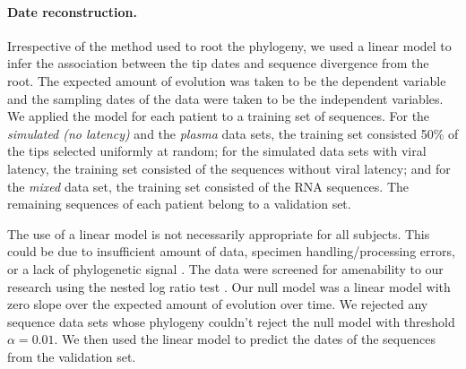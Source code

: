 \documentclass{bmcart}
\begin{document}
\paragraph * {Date reconstruction.} \label{subsec:daterecon}

Irrespective of the method used to root the phylogeny, we used a linear model to infer the association between the tip dates and sequence divergence from the root. 
The expected amount of evolution was taken to be the dependent variable and the sampling dates of the data were taken to be the independent variables.
We applied the model for each patient to a training set of sequences.
For the \emph{simulated (no latency)} and the \emph{plasma} data sets, the training set consisted 50\% of the tips selected uniformly at random; for the simulated data sets with viral latency, the training set consisted of the sequences without viral latency; and for the \emph{mixed} data set, the training set consisted of the RNA sequences.
The remaining sequences of each patient belong to a validation set.

The use of a linear model is not necessarily appropriate for all subjects.
This could be due to insufficient amount of data, specimen handling/processing errors, or a lack of phylogenetic signal \cite{Tempest}.
The data were screened for amenability to our research using the nested log ratio test \cite{Ho14}. 
Our null model was a linear model with zero slope over the expected amount of evolution over time.
We rejected any sequence data sets whose phylogeny couldn't reject the null model with threshold $\alpha=0.01$.
We then used the linear model to predict the dates of the sequences from the validation set.
\end{document}
